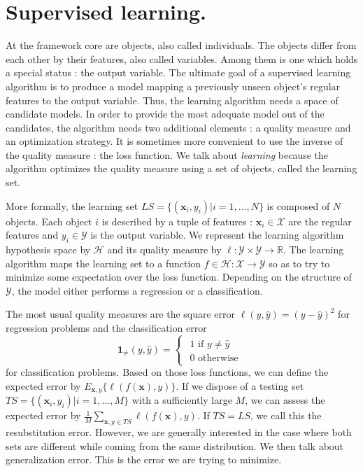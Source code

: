 \documentclass[a4paper]{report}
\newlength{\larg}
\begin{document}
\section{Supervised learning.}
At the framework core are objects, also called individuals. The objects differ from each other by their features, also called variables. Among them is one which holds a special status : the output variable. The ultimate goal of a supervised learning algorithm is to produce a model mapping a previously unseen object's regular features to the output variable. Thus, the learning algorithm needs a space of candidate models. In order to provide the most adequate model out of the candidates, the algorithm needs two additional elements : a quality measure and an optimization strategy. It is sometimes more convenient to use the inverse of the quality measure : the loss function. We talk about \textit{learning} because the algorithm optimizes the quality measure using a set of objects, called the learning set. 
\par
More formally, the learning set $LS = \{ (\boldsymbol{x}_i, y_i) | i = 1,..., N\}$ is composed of $N$ objects. Each object $i$ is described by a tuple of features : $\boldsymbol{x}_i \in \mathcal{X}$ are the regular features and $y_i \in \mathcal{Y}$ is the output variable. We represent the learning algorithm hypothesis space by $\mathcal{H}$ and its quality measure by $\ell : \mathcal{Y} \times \mathcal{Y} \rightarrow \mathbb{R}$. The learning algorithm maps the learning set to a function $f \in \mathcal{H} : \mathcal{X} \rightarrow \mathcal{Y}$ so as to try to minimize some expectation over the loss function. Depending on the structure of $\mathcal{Y}$, the model either performs a regression or a classification.
\par
The most usual quality measures are the square error $\ell(y, \hat{y}) = (y - \hat{y})^2$ for regression problems and the classification error
\[
\boldsymbol{1}_{\neq}(y,\hat{{y}})=\begin{cases}
\begin{array}{c}
1\text{ if }y \neq \hat{y}\\
0\text{ otherwise}
\end{array}\end{cases}
\]
for classification problems. Based on those loss functions, we can define the expected error by $E_{\boldsymbol{x},y} \{\ell(f(\boldsymbol{x}), y)\}$. If we dispose of a testing set $TS = \{ (\boldsymbol{x}_i, y_i) | i = 1,..., M\}$ with a sufficiently large $M$, we can assess the expected error by $\frac{1}{M}\sum_{\boldsymbol{x}, y \in TS} \ell(f(\boldsymbol{x}), y)$. If $TS = LS$, we call this the resubstitution error. However, we are generally interested in the case where both sets are different while coming from the same distribution. We then talk about generalization error. This is the error we are trying to minimize.
\end{document}
